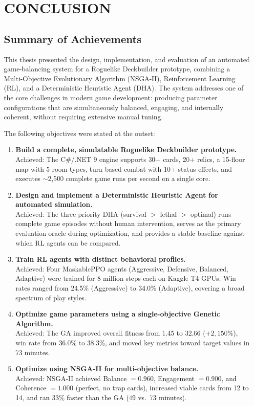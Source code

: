 \clearpage
{}
\chapter{CONCLUSION}
\label{chap:conclusion}

\section{Summary of Achievements}

This thesis presented the design, implementation, and evaluation of an automated game-balancing system for a Roguelike Deckbuilder prototype, combining a Multi-Objective Evolutionary Algorithm (NSGA-II), Reinforcement Learning (RL), and a Deterministic Heuristic Agent (DHA). The system addresses one of the core challenges in modern game development: producing parameter configurations that are simultaneously balanced, engaging, and internally coherent, without requiring extensive manual tuning.

The following objectives were stated at the outset:

\begin{enumerate}
    \item \textbf{Build a complete, simulatable Roguelike Deckbuilder prototype.} \\ Achieved: The C\#/.NET 9 engine supports 30+ cards, 20+ relics, a 15-floor map with 5 room types, turn-based combat with 10+ status effects, and executes $\sim$2,500 complete game runs per second on a single core.

    \item \textbf{Design and implement a Deterministic Heuristic Agent for automated simulation.} \\ Achieved: The three-priority DHA (survival $>$ lethal $>$ optimal) runs complete game episodes without human intervention, serves as the primary evaluation oracle during optimization, and provides a stable baseline against which RL agents can be compared.

    \item \textbf{Train RL agents with distinct behavioral profiles.} \\ Achieved: Four MaskablePPO agents (Aggressive, Defensive, Balanced, Adaptive) were trained for 8 million steps each on Kaggle T4 GPUs. Win rates ranged from 24.5\% (Aggressive) to 34.0\% (Adaptive), covering a broad spectrum of play styles.

    \item \textbf{Optimize game parameters using a single-objective Genetic Algorithm.} \\ Achieved: The GA improved overall fitness from 1.45 to 32.66 ($+2,150\%$), win rate from 36.0\% to 38.3\%, and moved key metrics toward target values in 73 minutes.

    \item \textbf{Optimize using NSGA-II for multi-objective balance.} \\ Achieved: NSGA-II achieved Balance $= 0.960$, Engagement $= 0.900$, and Coherence $= 1.000$ (perfect, no trap cards), increased viable cards from 12 to 14, and ran 33\% faster than the GA (49 vs.\ 73 minutes).
\end{enumerate}

